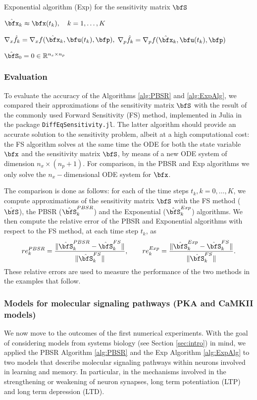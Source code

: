 \documentclass[DIV=12]{scrartcl} %
\newcommand{\rerr}{\ensuremath{re}}
\theoremstyle{definition}
\begin{document}
\begin{algorithm}
 \caption{Exponential algorithm (Exp) for the sensitivity matrix $\bfS$ \label{alg:ExpAlg}}
\SetAlgoLined
{}
$\hat{\bfx}_k\approx \bfx(t_k),\quad k=1,\dots,K$\;

$\nabla_x\hat{f}_k = \nabla_xf(\hat{\bfx}_k,\bfu(t_k),\bfp),$ \quad $\nabla_p\hat{f}_k = \nabla_pf(\hat{\bfx}_k,\bfu(t_k),\bfp)$\;

$\hat{\bfS}_0=0\in\mathbb{R}^{n_x\times n_p}$\;

\end{algorithm}

\subsubsection*{Evaluation}
To evaluate the accuracy of the Algorithms \ref{alg:PBSR} and \ref{alg:ExpAlg}, we compared their approximations of the sensitivity matrix $\bfS$ with the result of the commonly used Forward Sensitivity (FS) method, implemented in Julia in the package \texttt{DiffEqSensitivity.jl}. The latter algorithm should provide an accurate solution to the sensitivity problem, albeit at a high computational cost: the FS algorithm solves at the same time the ODE for both the state variable $\bfx$ and the sensitivity matrix $\bfS$, by means of a new ODE system of dimension $n_x\times(n_p+1)$. For comparison, in the PBSR and Exp algorithms we only solve the $n_x-$dimensional ODE system for $\bfx$.


The comparison is done as follows: for each of the time steps $t_k, k=0,\dots,K$, we compute approximations of the sensitivity matrix $\bfS$ with the FS method ($\hat{\bfS}$), the PBSR ($\hat{\bfS}^{PBSR}_k$) and the Exponential ($\hat{\bfS}^{Exp}_k$) algorithms. We then compute the relative error of the PBSR and Exponential algorithms with respect to the FS method, at each time step $t_k$, as
\[\rerr^{PBSR}_k = \frac{\|\hat{\bfS}^{PBSR}_k-\hat{\bfS}^{FS}_k\|}{\|\hat{\bfS}^{FS}_k\|}, \quad\quad \rerr^{Exp}_k = \frac{\|\hat{\bfS}^{Exp}_k-\hat{\bfS}^{FS}_k\|}{\|\hat{\bfS}^{FS}_k\|}.\]
These relative errors are used to measure the performance of the two methods in the examples that follow.
\subsubsection*{Models for molecular signaling pathways (PKA and CaMKII models)}
We now move to the outcomes of the first numerical experiments. With the goal of considering models from systems biology (see Section \ref{sec:intro}) in mind, we applied the PBSR Algorithm \ref{alg:PBSR} and the Exp Algorithm \ref{alg:ExpAlg} to two models that describe molecular signaling pathways within neurons involved in learning and memory. In particular, in the mechanisms involved in the strengthening or weakening of neuron synapses, long term potentiation (LTP) and long term depression (LTD). 
\end{document}
